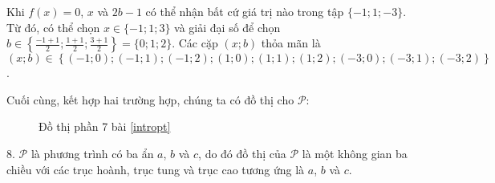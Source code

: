 Khi $f(x) = 0$, $x$ và $2b-1$ có thể nhận bất cứ giá trị nào trong tập $\{-1; 1; -3\}$. Từ đó, có thể chọn $x \in \{-1; 1; 3\}$ và giải đại số để chọn $b \in \left\{\frac{-1+1}{2}; \frac{1+1}{2}; \frac{3+1}{2}\right\} = \{0; 1; 2\}$. Các cặp $(x; b)$ thỏa mãn là $(x; b) \in \left\{\left(-1; 0\right); \left(-1; 1\right); \left(-1; 2\right); \left(1; 0\right); \left(1; 1\right); \left(1; 2\right); \left(-3; 0\right); \left(-3; 1\right); \left(-3; 2\right)\right\}$.

Cuối cùng, kết hợp hai trường hợp, chúng ta có đồ thị cho $\mathcal{P}$:

\begin{figure}[H]
   \centering
   \caption{Đồ thị phần 7 bài \ref{intropt}}
   \label{fig:ham_so_mot_bien:dinh_nghia:dtp7}
\end{figure}

8. $\mathcal{P}$ là phương trình có ba ẩn $a$, $b$ và $c$, do đó đồ thị của $\mathcal{P}$ là một không gian ba chiều với các trục hoành, trục tung và trục cao tương ứng là $a$, $b$ và $c$.

